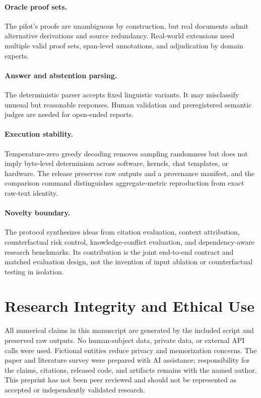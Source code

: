 \documentclass[10pt,twocolumn]{article}
\begin{document}
\paragraph{Oracle proof sets.}
The pilot's proofs are unambiguous by construction, but real documents admit alternative derivations and source redundancy. Real-world extensions need multiple valid proof sets, span-level annotations, and adjudication by domain experts.

\paragraph{Answer and abstention parsing.}
The deterministic parser accepts fixed linguistic variants. It may misclassify unusual but reasonable responses. Human validation and preregistered semantic judges are needed for open-ended reports.

\paragraph{Execution stability.}
Temperature-zero greedy decoding removes sampling randomness but does not imply byte-level determinism across software, kernels, chat templates, or hardware. The release preserves raw outputs and a provenance manifest, and the comparison command distinguishes aggregate-metric reproduction from exact raw-text identity.

\paragraph{Novelty boundary.}
The protocol synthesizes ideas from citation evaluation, context attribution, counterfactual risk control, knowledge-conflict evaluation, and dependency-aware research benchmarks. Its contribution is the joint end-to-end contract and matched evaluation design, not the invention of input ablation or counterfactual testing in isolation.

\section{Research Integrity and Ethical Use}

All numerical claims in this manuscript are generated by the included script and preserved raw outputs. No human-subject data, private data, or external API calls were used. Fictional entities reduce privacy and memorization concerns. The paper and literature survey were prepared with AI assistance; responsibility for the claims, citations, released code, and artifacts remains with the named author. This preprint has not been peer reviewed and should not be represented as accepted or independently validated research.
\end{document}
